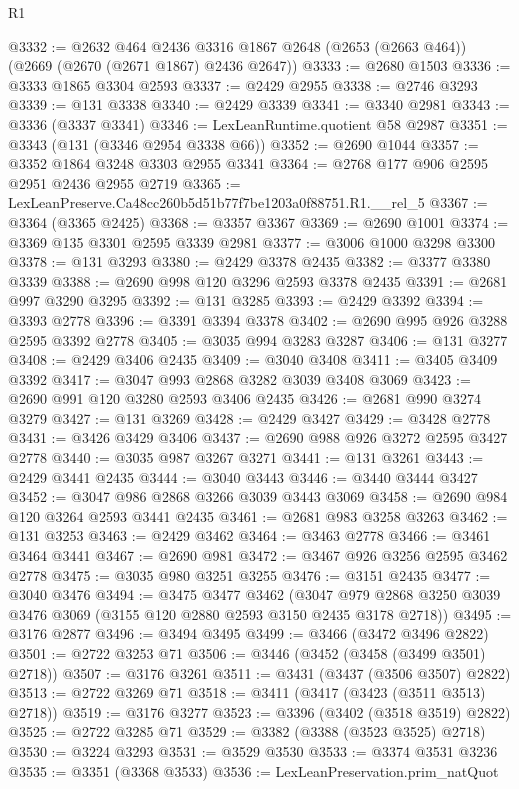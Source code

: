 \begin{lexlean}{R1}
\begin{coremodule}
@3332 := @2632
    @464
    @2436
    @3316
    @1867
    @2648
    (@2653 (@2663 @464))
    (@2669 (@2670 (@2671 @1867) @2436 @2647))
@3333 := @2680 @1503
@3336 := @3333 @1865 @3304 @2593
@3337 := @2429 @2955
@3338 := @2746 @3293
@3339 := @131 @3338
@3340 := @2429 @3339
@3341 := @3340 @2981
@3343 := @3336 (@3337 @3341)
@3346 := LexLeanRuntime.quotient @58 @2987
@3351 := @3343 (@131 (@3346 @2954 @3338 @66))
@3352 := @2690 @1044
@3357 := @3352 @1864 @3248 @3303 @2955 @3341
@3364 := @2768 @177 @906 @2595 @2951 @2436 @2955 @2719
@3365 := LexLeanPreserve.Ca48cc260b5d51b77f7be1203a0f88751.R1.__rel_5
@3367 := @3364 (@3365 @2425)
@3368 := @3357 @3367
@3369 := @2690 @1001
@3374 := @3369 @135 @3301 @2595 @3339 @2981
@3377 := @3006 @1000 @3298 @3300
@3378 := @131 @3293
@3380 := @2429 @3378 @2435
@3382 := @3377 @3380 @3339
@3388 := @2690 @998 @120 @3296 @2593 @3378 @2435
@3391 := @2681 @997 @3290 @3295
@3392 := @131 @3285
@3393 := @2429 @3392
@3394 := @3393 @2778
@3396 := @3391 @3394 @3378
@3402 := @2690 @995 @926 @3288 @2595 @3392 @2778
@3405 := @3035 @994 @3283 @3287
@3406 := @131 @3277
@3408 := @2429 @3406 @2435
@3409 := @3040 @3408
@3411 := @3405 @3409 @3392
@3417 := @3047 @993 @2868 @3282 @3039 @3408 @3069
@3423 := @2690 @991 @120 @3280 @2593 @3406 @2435
@3426 := @2681 @990 @3274 @3279
@3427 := @131 @3269
@3428 := @2429 @3427
@3429 := @3428 @2778
@3431 := @3426 @3429 @3406
@3437 := @2690 @988 @926 @3272 @2595 @3427 @2778
@3440 := @3035 @987 @3267 @3271
@3441 := @131 @3261
@3443 := @2429 @3441 @2435
@3444 := @3040 @3443
@3446 := @3440 @3444 @3427
@3452 := @3047 @986 @2868 @3266 @3039 @3443 @3069
@3458 := @2690 @984 @120 @3264 @2593 @3441 @2435
@3461 := @2681 @983 @3258 @3263
@3462 := @131 @3253
@3463 := @2429 @3462
@3464 := @3463 @2778
@3466 := @3461 @3464 @3441
@3467 := @2690 @981
@3472 := @3467 @926 @3256 @2595 @3462 @2778
@3475 := @3035 @980 @3251 @3255
@3476 := @3151 @2435
@3477 := @3040 @3476
@3494 := @3475
    @3477
    @3462
    (@3047 @979 @2868 @3250 @3039 @3476 @3069 (@3155 @120 @2880 @2593 @3150 @2435 @3178 @2718))
@3495 := @3176 @2877
@3496 := @3494 @3495
@3499 := @3466 (@3472 @3496 @2822)
@3501 := @2722 @3253 @71
@3506 := @3446 (@3452 (@3458 (@3499 @3501) @2718))
@3507 := @3176 @3261
@3511 := @3431 (@3437 (@3506 @3507) @2822)
@3513 := @2722 @3269 @71
@3518 := @3411 (@3417 (@3423 (@3511 @3513) @2718))
@3519 := @3176 @3277
@3523 := @3396 (@3402 (@3518 @3519) @2822)
@3525 := @2722 @3285 @71
@3529 := @3382 (@3388 (@3523 @3525) @2718)
@3530 := @3224 @3293
@3531 := @3529 @3530
@3533 := @3374 @3531 @3236
@3535 := @3351 (@3368 @3533)
@3536 := LexLeanPreservation.prim_natQuot

\end{coremodule}
\end{lexlean}
